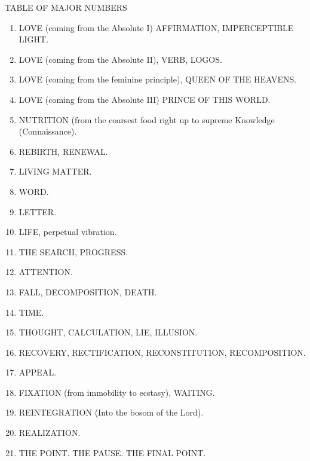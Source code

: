 \begin{quotex}
TABLE OF MAJOR NUMBERS
\begin{enumerate}[label=\Roman*.]
\item LOVE (coming from the Absolute I) AFFIRMATION, IMPERCEPTIBLE LIGHT.

\item LOVE (coming from the Absolute II), VERB, LOGOS.

\item LOVE (coming from the feminine principle), QUEEN OF THE HEAVENS.

\item LOVE (coming from the Absolute III) PRINCE OF THIS WORLD. 

\item NUTRITION (from the coarsest food right up to supreme Knowledge (Connaissance).

\item REBIRTH, RENEWAL.

\item LIVING MATTER.

\item WORD.

\item LETTER.

\item LIFE, perpetual vibration.

\item THE SEARCH, PROGRESS.

\item ATTENTION.

\item FALL, DECOMPOSITION, DEATH.

\item TIME.

\item THOUGHT, CALCULATION, LIE, ILLUSION.

\item RECOVERY, RECTIFICATION, RECONSTITUTION, RECOMPOSITION.

\item APPEAL.

\item FIXATION (from immobility to ecstasy), WAITING. 

\item REINTEGRATION (Into the bosom of the Lord). 

\item REALIZATION.

\item THE POINT. THE PAUSE. THE FINAL POINT. 


\end{enumerate}
\end{quotex}
